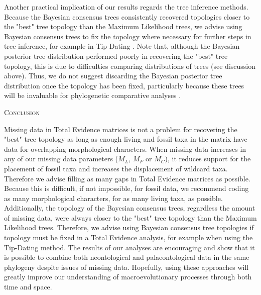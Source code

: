 \documentclass[12pt,letterpaper]{article}
\renewcommand{\section}[1]{%
\bigskip
\begin{center}
\begin{Large}
\normalfont\scshape #1
\medskip
\end{Large}
\end{center}}
\begin{document}
Another practical implication of our results regards the tree inference methods. Because the Bayesian consensus trees consistently recovered topologies closer to the "best" tree topology than the Maximum Likelihood trees, we advise using Bayesian consensus trees to fix the topology where necessary for further steps in tree inference, for example in Tip-Dating \citep{ronquista2012,BEASTmaster}. Note that, although the Bayesian posterior tree distribution performed poorly in recovering the "best" tree topology, this is due to difficulties comparing distributions of trees (see discussion above). Thus, we do not suggest discarding the Bayesian posterior tree distribution once the topology has been fixed, particularly because these trees will be invaluable for phylogenetic comparative analyses \citep[e.g.][]{jetzthe2012}.
    
%
%

\section{Conclusion}

Missing data in Total Evidence matrices is not a problem for recovering the "best" tree topology as long as enough living and fossil taxa in the matrix have data for overlapping morphological characters. When missing data increases in any of our missing data parameters ($M_{L}$, $M_{F}$ or $M_{C}$), it reduces support for the placement of fossil taxa and increases the displacement of wildcard taxa. Therefore we advise filling as many gaps in Total Evidence matrices as possible. Because this is difficult, if not impossible, for fossil data, we recommend coding as many morphological characters, for as many living taxa, as possible. Additionally, the topology of the Bayesian consensus trees, regardless the amount of missing data, were always closer to the "best" tree topology than the Maximum Likelihood trees. Therefore, we advise using Bayesian consensus tree topologies if topology must be fixed in a Total Evidence analysis, for example when using the Tip-Dating method. The results of our analyses are encouraging and show that it is possible to combine both neontological and palaeontological data in the same phylogeny despite issues of missing data. Hopefully, using these approaches will greatly improve our understanding of macroevolutionary processes through both time and space.

%
%
\end{document}
